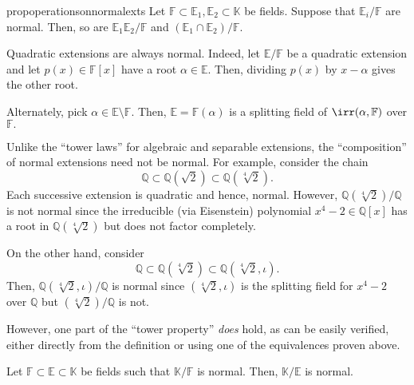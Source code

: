 \begin{restatable}[]{prop}{operationsonnormalexts}
\label{prop:operationsonnormalexts}
    Let $\mathbb{F} \subset \mathbb{E}_1, \mathbb{E}_2 \subset \mathbb{K}$ be fields. Suppose that $\mathbb{E}_i/\mathbb{F}$ are normal. Then, so are $\mathbb{E}_1\mathbb{E}_2/\mathbb{F}$ and $(\mathbb{E}_1 \cap \mathbb{E}_2)/\mathbb{F}.$ \hfill\hyperref[prop:operationsonnormalexts2]{\downsym}
\end{restatable}

\begin{ex}
    Quadratic extensions are always normal. Indeed, let $\mathbb{E}/\mathbb{F}$ be a quadratic extension and let $p(x) \in \mathbb{F}[x]$ have a root $\alpha \in \mathbb{E}.$ Then, dividing $p(x)$ by $x - \alpha$ gives the other root.

    Alternately, pick $\alpha \in \mathbb{E} \setminus \mathbb{F}.$ Then, $\mathbb{E} = \mathbb{F}(\alpha)$ is a splitting field of $\irr(\alpha, \mathbb{F})$ over $\mathbb{F}.$
\end{ex}

\begin{rem}
    Unlike the ``tower laws'' for algebraic and separable extensions, the ``composition'' of normal extensions need not be normal. For example, consider the chain
    \begin{equation*} 
        \mathbb{Q} \subset \mathbb{Q}(\sqrt{2}) \subset \mathbb{Q}(\sqrt[4]{2}).
    \end{equation*}
    Each successive extension is quadratic and hence, normal. However, $\mathbb{Q}(\sqrt[4]{2})/\mathbb{Q}$ is not normal since the irreducible (via Eisenstein) polynomial $x^4 - 2 \in \mathbb{Q}[x]$ has a root in $\mathbb{Q}(\sqrt[4]{2})$ but does not factor completely.

    On the other hand, consider
    \begin{equation*} 
        \mathbb{Q} \subset \mathbb{Q}(\sqrt[4]{2}) \subset \mathbb{Q}(\sqrt[4]{2}, \iota).
    \end{equation*}
    Then, $\mathbb{Q}(\sqrt[4]{2}, \iota)/\mathbb{Q}$ is normal since $(\sqrt[4]{2}, \iota)$ is the splitting field for $x^4 - 2$ over $\mathbb{Q}$ but $(\sqrt[4]{2})/\mathbb{Q}$ is not.
\end{rem}

However, one part of the ``tower property'' \emph{does} hold, as can be easily verified, either directly from the definition or using one of the equivalences proven above.

\begin{prop} \label{prop:decompnormal}
    Let $\mathbb{F} \subset \mathbb{E} \subset \mathbb{K}$ be fields such that $\mathbb{K}/\mathbb{F}$ is normal. Then, $\mathbb{K}/\mathbb{E}$ is normal.
\end{prop}

